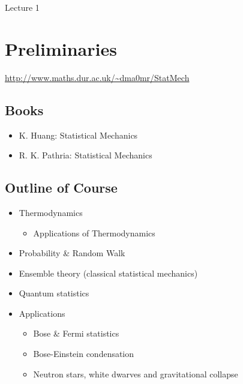 \begin{center}

Lecture 1

\end{center}

\section*{Preliminaries}

\url{http://www.maths.dur.ac.uk/~dma0mr/StatMech}

\subsection*{Books}

\begin{itemize}

\item K. Huang: Statistical Mechanics

\item R. K. Pathria: Statistical Mechanics

\end{itemize}

\subsection*{Outline of Course}

\begin{itemize}

\item Thermodynamics

	\begin{itemize}
	\item Applications of Thermodynamics
	\end{itemize}

\item Probability \& Random Walk

\item Ensemble theory (classical statistical mechanics)

\item Quantum statistics

\item Applications

	\begin{itemize}
	\item Bose \& Fermi statistics
	\item Bose-Einstein condensation
	\item Neutron stars, white dwarves and gravitational collapse
	\end{itemize}


\end{itemize}

